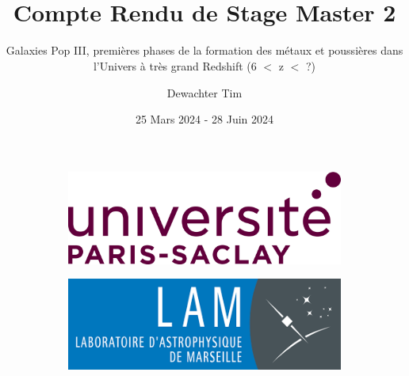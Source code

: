 \documentclass[11pt, a4paper]{article}
\title{\textbf{ \\{\Huge Compte Rendu de Stage Master 2}}}
\subtitle{Galaxies Pop III, premières phases de la formation des métaux et poussières dans l'Univers à très grand Redshift (6 $<$ z $<$ ?)}
\author{Dewachter Tim}
\date{25 Mars 2024 - 28 Juin 2024}
\begin{document}
\maketitle

\begin{figure}
  \centering
     \begin{subfigure}[b]{0.3\textwidth}
         \centering
         \includegraphics[width=\textwidth]{assets/paris-saclay.png}
     \end{subfigure}
     \hfill
     \begin{subfigure}[b]{0.3\textwidth}
         \centering
         \includegraphics[width=\textwidth]{assets/lam.png}
     \end{subfigure}
\end{figure}
\end{document}
